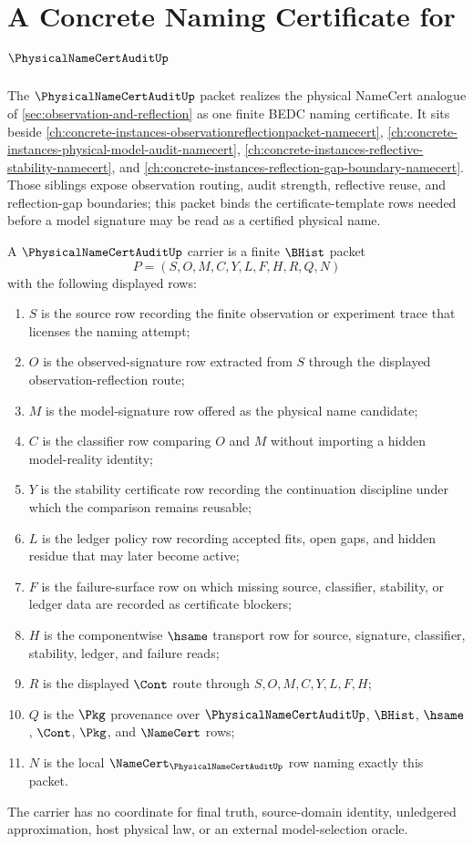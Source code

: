 \chapter{A Concrete Naming Certificate for $\PhysicalNameCertAuditUp$}
\label{ch:concrete-instances-physical-namecert-audit-namecert}

The $\PhysicalNameCertAuditUp$ packet realizes the physical NameCert analogue of \autoref{sec:observation-and-reflection} as one finite BEDC naming certificate. It sits beside \autoref{ch:concrete-instances-observationreflectionpacket-namecert}, \autoref{ch:concrete-instances-physical-model-audit-namecert}, \autoref{ch:concrete-instances-reflective-stability-namecert}, and \autoref{ch:concrete-instances-reflection-gap-boundary-namecert}. Those siblings expose observation routing, audit strength, reflective reuse, and reflection-gap boundaries; this packet binds the certificate-template rows needed before a model signature may be read as a certified physical name.

\begin{definition}
\label{def:physical-namecert-audit-carrier}
A $\PhysicalNameCertAuditUp$ carrier is a finite $\BHist$ packet
$$
P=(S,O,M,C,Y,L,F,H,R,Q,N)
$$
with the following displayed rows:
\begin{enumerate}
\item $S$ is the source row recording the finite observation or experiment trace that licenses the naming attempt;
\item $O$ is the observed-signature row extracted from $S$ through the displayed observation-reflection route;
\item $M$ is the model-signature row offered as the physical name candidate;
\item $C$ is the classifier row comparing $O$ and $M$ without importing a hidden model-reality identity;
\item $Y$ is the stability certificate row recording the continuation discipline under which the comparison remains reusable;
\item $L$ is the ledger policy row recording accepted fits, open gaps, and hidden residue that may later become active;
\item $F$ is the failure-surface row on which missing source, classifier, stability, or ledger data are recorded as certificate blockers;
\item $H$ is the componentwise $\hsame$ transport row for source, signature, classifier, stability, ledger, and failure reads;
\item $R$ is the displayed $\Cont$ route through $S,O,M,C,Y,L,F,H$;
\item $Q$ is the $\Pkg$ provenance over $\PhysicalNameCertAuditUp$, $\BHist$, $\hsame$, $\Cont$, $\Pkg$, and $\NameCert$ rows;
\item $N$ is the local $\NameCert_{\PhysicalNameCertAuditUp}$ row naming exactly this packet.
\end{enumerate}
The carrier has no coordinate for final truth, source-domain identity, unledgered approximation, host physical law, or an external model-selection oracle.
\end{definition}

